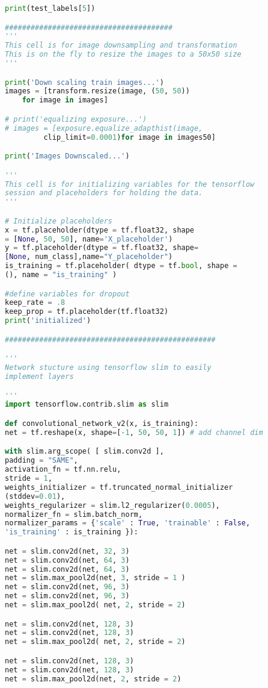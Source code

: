 \begin{lstlisting}[language=python, frame=single]
print(test_labels[5])

#######################################
'''
This cell is for image downsampling and transformation
This is on the fly to resize the images to a 50x50 size
'''

print('Down scaling train images...')
images = [transform.resize(image, (50, 50)) 
	for image in images]

# print('equalizing exposure...')
# images = [exposure.equalize_adapthist(image,
		 clip_limit=0.0001)for image in images50]

print('Images Downscaled...')

'''
This cell is for initializing variables for the tensorflow 
session and placeholders for holding the data.
'''

# Initialize placeholders 
x = tf.placeholder(dtype = tf.float32, shape 
= [None, 50, 50], name='X_placeholder')
y = tf.placeholder(dtype = tf.float32, shape= 
[None, num_class],name="Y_placeholder")
is_training = tf.placeholder( dtype = tf.bool, shape = 
(), name = "is_training" )

#define variables for dropout
keep_rate = .8
keep_prop = tf.placeholder(tf.float32)
print('initialized')

#################################################

'''
Network stucture using tensorflow slim to easily 
implement layers 

'''
import tensorflow.contrib.slim as slim

def convolutional_network_v2(x, is_training):
net = tf.reshape(x, shape=[-1, 50, 50, 1]) # add channel dim

with slim.arg_scope( [ slim.conv2d ],
padding = "SAME",
activation_fn = tf.nn.relu,
stride = 1,
weights_initializer = tf.truncated_normal_initializer
(stddev=0.01),
weights_regularizer = slim.l2_regularizer(0.0005),
normalizer_fn = slim.batch_norm,
normalizer_params = {'scale' : True, 'trainable' : False, 
'is_training' : is_training }):

net = slim.conv2d(net, 32, 3)
net = slim.conv2d(net, 64, 3)
net = slim.conv2d(net, 64, 3)
net = slim.max_pool2d(net, 3, stride = 1 )
net = slim.conv2d(net, 96, 3)
net = slim.conv2d(net, 96, 3)
net = slim.max_pool2d( net, 2, stride = 2)

net = slim.conv2d(net, 128, 3)
net = slim.conv2d(net, 128, 3)
net = slim.max_pool2d( net, 2, stride = 2)

net = slim.conv2d(net, 128, 3)
net = slim.conv2d(net, 128, 3)
net = slim.max_pool2d(net, 2, stride = 2)


\end{lstlisting}
